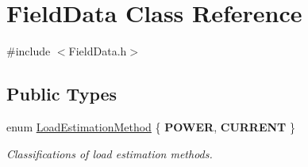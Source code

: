 \hypertarget{class_field_data}{}\section{Field\+Data Class Reference}
\label{class_field_data}


{\ttfamily \#include $<$Field\+Data.\+h$>$}

\subsection*{Public Types}
\begin{DoxyCompactItemize}
\item 
\mbox{\label{class_field_data_a424e89914ba5684c01bb269dbe3312fd}} 
enum \hyperlink{class_field_data_a424e89914ba5684c01bb269dbe3312fd}{Load\+Estimation\+Method} \{ {\bfseries P\+O\+W\+ER}, 
{\bfseries C\+U\+R\+R\+E\+NT}
 \}\begin{DoxyCompactList}\small\item\em Classifications of load estimation methods. \end{DoxyCompactList}
\end{DoxyCompactItemize}
